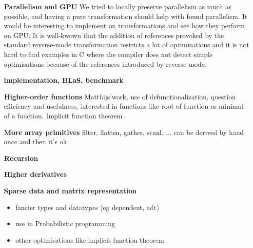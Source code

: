 \noindent \textbf{Parallelism and GPU}
We tried to locally preserve parallelism as much as possible, 
and having a pure transformation should help with found parallelism. 
It would be interesting to implement on transformations and see how they perform on GPU.
It is well-kwown that the addition of references provoked by the standard reverse-mode transformation
restricts a lot of optimisations and it is not hard to find examples in C where the compiler does not detect simple optimisations 
because of the references introduced by reverse-mode.

\noindent \textbf{implementation, BLaS, benchmark}

\noindent \textbf{Higher-order functions}
Matthijs'work, use of defunctionalization, question efficiency and usefulness, 
interested in functions like root of function or minimal of a function. Implicit function theorem

\noindent \textbf{More array primitives}
filter, flatten, gather, scanl, ...
can be derived by hand once and then it's ok

\noindent \textbf{Recursion}

\noindent \textbf{Higher derivatives}

\noindent \textbf{Sparse data and matrix representation}


\begin{itemize}
    \item fancier types and datatypes (eg dependent, adt) 
    \item use in Probabilistic programming
    \item other optimisations like implicit function theorem
\end{itemize}



\clearpage